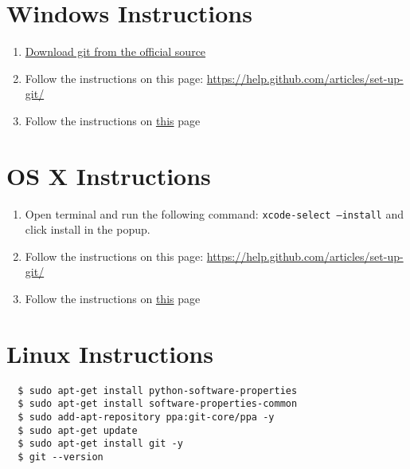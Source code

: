 \documentclass[11pt,fleqn]{article}
\begin{document}
\section*{Windows Instructions}
\begin{enumerate}
 \item
       \href{https://git-scm.com/download/win}{Download git from the official source}

 \item
       Follow the instructions on this page: \href{https://help.github.com/articles/set-up-git/}{https://help.github.com/articles/set-up-git/}

 \item
       Follow the instructions on \href{https://help.github.com/articles/caching-your-github-password-in-git/#platform-windows}{this} page

\end{enumerate}

\section*{OS X Instructions}
\begin{enumerate}
 \item
       Open terminal and run the following command: \texttt{xcode-select --install} and click
       install in the popup.

 \item
       Follow the instructions on this page: \href{https://help.github.com/articles/set-up-git/}{https://help.github.com/articles/set-up-git/}

 \item
       Follow the instructions on  \href{https://help.github.com/articles/caching-your-github-password-in-git/#platform-mac}{this} page

\end{enumerate}

\section*{Linux Instructions}

\begin{verbatim}
  $ sudo apt-get install python-software-properties
  $ sudo apt-get install software-properties-common
  $ sudo add-apt-repository ppa:git-core/ppa -y
  $ sudo apt-get update
  $ sudo apt-get install git -y
  $ git --version
 \end{verbatim}
\end{document}
